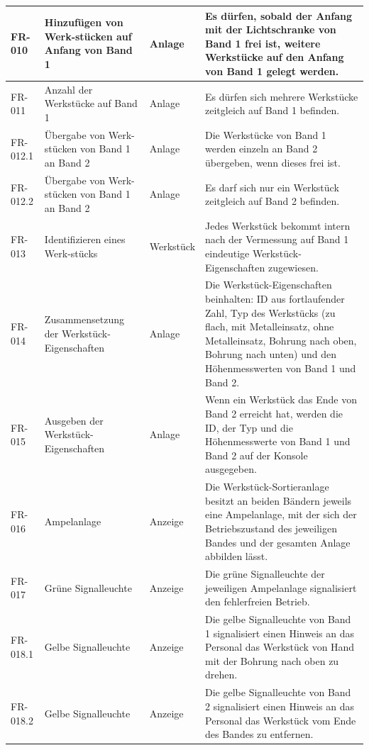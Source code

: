 \documentclass[oneside,a4paper,titlepage]{scrartcl} %
\begin{document}
\begin{small}
\begin{longtable}{|p{2cm}|p{4cm}|p{1.5cm}|p{5.5cm}|}
  \hline
  \rowcolor{gray} FR-010 & Hinzufügen von Werk-stücken auf Anfang von Band 1 & Anlage & Es dürfen, sobald der Anfang mit der Lichtschranke von Band 1 frei ist, weitere Werkstücke auf den Anfang von Band 1 gelegt werden.\\
  \hline
  FR-011 & Anzahl der Werkstücke auf Band 1 & Anlage & Es dürfen sich mehrere Werkstücke zeitgleich auf Band 1 befinden.\\
  \hline
  \rowcolor{gray} FR-012.1 & Übergabe von Werk-stücken von Band 1 an Band 2 & Anlage & Die Werkstücke von Band 1 werden einzeln an Band 2 übergeben, wenn dieses frei ist.\\
  \hline    
  \rowcolor{gray} FR-012.2 & Übergabe von Werk-stücken von Band 1 an Band 2 & Anlage & Es darf sich nur ein Werkstück zeitgleich auf Band 2 befinden.\\
  \hline
  FR-013 & Identifizieren eines Werk-stücks & Werkstück & Jedes Werkstück bekommt intern nach der Vermessung auf Band 1 eindeutige Werkstück-Eigenschaften zugewiesen.\\
  \hline
  \rowcolor{gray} FR-014 & Zusammensetzung der Werkstück-Eigenschaften & Anlage & Die Werkstück-Eigenschaften beinhalten: ID aus fortlaufender Zahl, Typ des Werkstücks (zu flach, mit Metalleinsatz, ohne Metalleinsatz, Bohrung nach oben, Bohrung nach unten) und den Höhenmesswerten von Band 1 und Band 2.\\
  \hline
  FR-015 & Ausgeben der Werkstück-Eigenschaften & Anlage & Wenn ein Werkstück das Ende von Band 2 erreicht hat, werden die ID, der Typ und die Höhenmesswerte von Band 1 und Band 2 auf der Konsole ausgegeben.\\
  \hline
  \rowcolor{gray} FR-016 & Ampelanlage & Anzeige & Die Werkstück-Sortieranlage besitzt an beiden Bändern jeweils eine Ampelanlage, mit der sich der Betriebszustand des jeweiligen Bandes und der gesamten Anlage abbilden lässt.\\
  \hline
  FR-017 & Grüne Signalleuchte & Anzeige & Die grüne Signalleuchte der jeweiligen Ampelanlage signalisiert den fehlerfreien Betrieb.\\
  \hline
  \rowcolor{gray} FR-018.1 & Gelbe Signalleuchte & Anzeige & Die gelbe Signalleuchte von Band 1 signalisiert einen Hinweis an das Personal das Werkstück von Hand mit der Bohrung nach oben zu drehen.\\
  \hline
  \rowcolor{gray} FR-018.2 & Gelbe Signalleuchte & Anzeige & Die gelbe Signalleuchte von Band 2 signalisiert einen Hinweis an das Personal das Werkstück vom Ende des Bandes zu entfernen.\\

\end{longtable}
\end{small}
\end{document}
